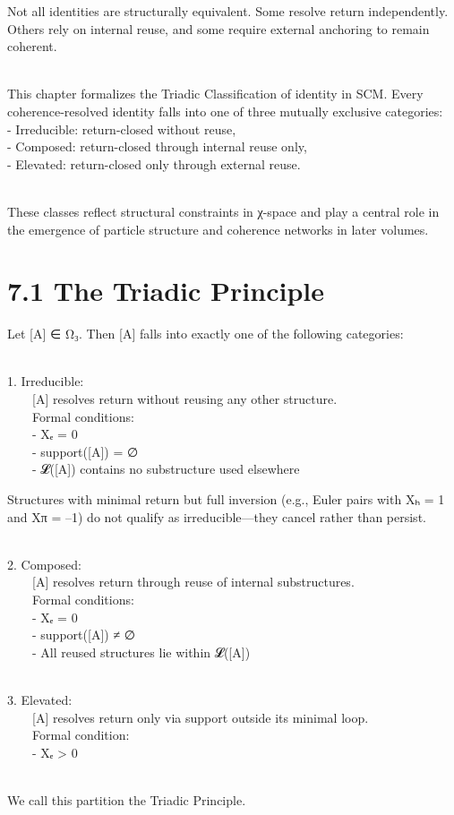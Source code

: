 Not all identities are structurally equivalent. Some resolve return
independently. Others rely on internal reuse, and some require external
anchoring to remain coherent.\\
\strut \\
This chapter formalizes the Triadic Classification of identity in SCM.
Every coherence-resolved identity falls into one of three mutually
exclusive categories:\\
- Irreducible: return-closed without reuse,\\
- Composed: return-closed through internal reuse only,\\
- Elevated: return-closed only through external reuse.\\
\strut \\
These classes reflect structural constraints in χ-space and play a
central role in the emergence of particle structure and coherence
networks in later volumes.

\section{7.1 \textbar{} The Triadic
Principle}\label{the-triadic-principle}

Let {[}A{]} ∈ Ω₃. Then {[}A{]} falls into exactly one of the following
categories:\\
\strut \\
1. Irreducible:\\
  {[}A{]} resolves return without reusing any other structure.\\
  Formal conditions:\\
  - Xₑ = 0\\
  - support({[}A{]}) = ∅\\
  - 𝓛({[}A{]}) contains no substructure used elsewhere

Structures with minimal return but full inversion (e.g., Euler pairs
with Xₕ = 1 and Xπ = --1) do not qualify as irreducible---they cancel
rather than persist.\\
\strut \\
2. Composed:\\
  {[}A{]} resolves return through reuse of internal substructures.\\
  Formal conditions:\\
  - Xₑ = 0\\
  - support({[}A{]}) ≠ ∅\\
  - All reused structures lie within 𝓛({[}A{]})\\
\strut \\
3. Elevated:\\
  {[}A{]} resolves return only via support outside its minimal loop.\\
  Formal condition:\\
  - Xₑ \textgreater{} 0\\
\strut \\
We call this partition the Triadic Principle.

